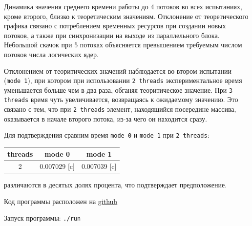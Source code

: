 Динамика значения среднего времени работы до 4 потоков во всех испытаниях, кроме второго, близко к теоретическим значениям. Отклонение от теоретического графика связано с потреблением временных ресурсов при создании новых потоков, а также при синхронизации на выходе из параллельного блока. Небольшой скачок при 5 потоках объясняется превышением требуемым числом потоков числа логических ядер.\\

\newpage

Отклонением от теоритических значений наблюдается во втором испытании (\verb|mode 1|), при котором при использовании \verb|2 threads| экспериментальное время уменьшается больше чем в два раза, обганяя теоритическое значение. При \verb|3 threads| время чуть увеличивается, возвращаясь к ожидаемому значению. Это связано с тем, что при \verb|2 threads| элемент, находящийся посередине массива, оказывается в начале второго потока, из-за чего он находится сразу.

Для подтверждения сравним время \verb|mode 0| и \verb|mode 1| при \verb|2 threads|:

\begin{center}
\renewcommand{\arraystretch}{1.4}
\begin{tabular}{|c|c|c|} 
    \hline
    threads & mode 0 & mode 1 \\
    \hline
    2 & 0.007029 [c] & 0.007039 [c]\\
    \hline
\end{tabular}
\end{center}

 различаются в десятых долях процента, что подтверждает предположение.


\noindent Код программы расположен на \href{https://github.com/GektorPestarzt/MEPHI_parallel/tree/main/lab2}{github}

\noindent Запуск программы: \verb|./run|